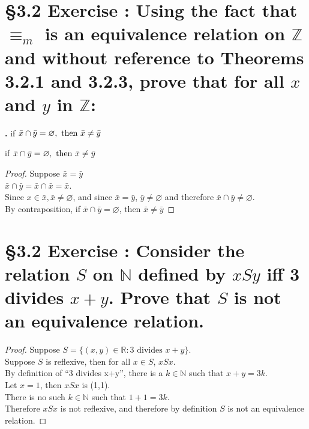 \documentclass[a4paper,11pt]{article}
\begin{document}
\section*{\S 3.2 Exercise : Using the fact that \(\equiv_{m}\) is an equivalence relation on \(\mathbb{Z}\) and without reference to Theorems 3.2.1 and 3.2.3, prove that for all \(x\) and \(y\) in \(\mathbb{Z}\):}
\setcounter{SubsectionCounter}{6}
\textbf{.}
if \(\bar{x} \cap \bar{y} = \empty \varnothing, \text{ then } \bar{x} \neq 
\bar{y}\)
\begin{theorem1}
if \(\bar{x} \cap \bar{y} = \empty \varnothing, \text{ then } \bar{x} \neq 
\bar{y}\)
   \begin{proof}
Suppose \(\bar{x} = \bar{y}\)\\
\(\bar{x} \cap \bar{y} = \bar{x} \cap \bar{x} = \bar{x}\).\\
Since \(x \in \bar{x}, \bar{x} \neq \varnothing\), and since \({\bar{x} = \bar{y}}\), \(\bar{y} \neq \varnothing\) and 
therefore \(\bar{x} \cap \bar{y} \neq \varnothing\).\\
By contraposition, if \(\bar{x} \cap \bar{y} = \varnothing\), then \(\bar{x} \neq \bar{y}\)
     \end{proof}
  \end{theorem1}
\newpage
\setcounter{ProblemCounter}{11}
\section*{\S 3.2 Exercise : Consider the relation \(S\) on \(\mathbb{N}\) defined by \(x S y\) iff 3 divides \(x + y\). Prove that \(S\) is not an equivalence relation.}
\begin{theorem1}
  \begin{proof}
Suppose \(S = \{{(x,y)} \in \mathbb{R}: 3 \text{ divides } x+y\}\).\\
Suppose \(S\) is reflexive, then for all \(x \in S\), \(xSx\).\\
By definition of ``3 divides x+y'', there is a \(k \in \mathbb{N}\) such that 
\(x+y=3k\).\\
Let \(x=1\), then \(xSx\) is (1,1).\\
There is no such \(k \in \mathbb{N}\) such that \(1+1 = 
3k\).\\
Therefore \(xSx\) is not reflexive, and therefore by definition \(S\) is not an 
equivalence relation.
  \end{proof}
\end{theorem1}
\newpage
\setcounter{ProblemCounter}{2}
\end{document}
